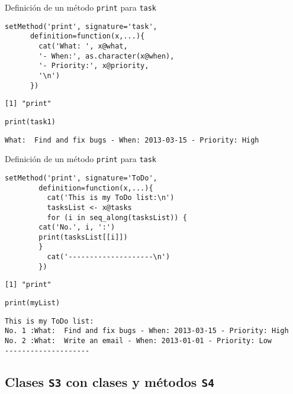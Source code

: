 \documentclass[xcolor={usenames,svgnames,dvipsnames}]{beamer}
\begin{document}
\begin{frame}[fragile,label=sec-3-2-3]{Definición de un método \texttt{print} para \texttt{task}}
 \lstset{language=R,numbers=none}
\begin{lstlisting}
setMethod('print', signature='task',
	  definition=function(x,...){
	    cat('What: ', x@what,
		'- When:', as.character(x@when),
		'- Priority:', x@priority,
		'\n')
	  })
\end{lstlisting}

\begin{verbatim}
[1] "print"
\end{verbatim}


\lstset{language=R,numbers=none}
\begin{lstlisting}
print(task1)
\end{lstlisting}

\begin{verbatim}
What:  Find and fix bugs - When: 2013-03-15 - Priority: High
\end{verbatim}
\end{frame}
\begin{frame}[fragile,label=sec-3-2-4]{Definición de un método \texttt{print} para \texttt{task}}
 \lstset{language=R,numbers=none}
\begin{lstlisting}
setMethod('print', signature='ToDo',
	    definition=function(x,...){
	      cat('This is my ToDo list:\n')
	      tasksList <- x@tasks
	      for (i in seq_along(tasksList)) {
		cat('No.', i, ':')
		print(tasksList[[i]])
		}
	      cat('--------------------\n')
	    })
\end{lstlisting}

\begin{verbatim}
[1] "print"
\end{verbatim}

\lstset{language=R,numbers=none}
\begin{lstlisting}
print(myList)
\end{lstlisting}

\begin{verbatim}
This is my ToDo list:
No. 1 :What:  Find and fix bugs - When: 2013-03-15 - Priority: High 
No. 2 :What:  Write an email - When: 2013-01-01 - Priority: Low 
--------------------
\end{verbatim}
\end{frame}
\subsection{Clases \texttt{S3} con clases y métodos \texttt{S4}}
\label{sec-3-3}
\end{document}
